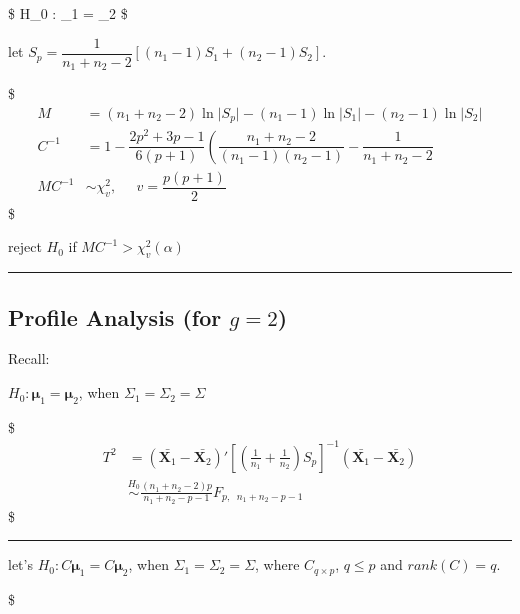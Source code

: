 \documentclass[
]{book}
\begin{document}
{{{\$
H\_0 : \Sigma\_1 = \Sigma\_2
\$

let \(S_p = \dfrac{1}{n_1 + n_2 - 2} \left[ (n_1 - 1) S_1 + (n_2 - 1) S_2 \right]\).

\$
\begin{align*}

M &= (n_1 + n_2 - 2) \ln \vert S_p \vert - (n_1 - 1) \ln \vert S_1 \vert - (n_2 - 1) \ln \vert S_2 \vert \tag{test stat} \\

C^{-1} &= 1 - \dfrac{2p^2 + 3p -1}{6(p+1)} \left( \dfrac {n_1 + n_2 - 2}{(n_1-1)(n_2 - 1)} - \dfrac {1}{n_1 + n_2 - 2} \tag{Scale Factor} \\

MC^{-1} &\sim \chi_v^2, \; \; \; \; \; v=\dfrac{p(p+1)}{2}
\end{align*}
\$

reject \(H_0\) if \(MC^{-1} > \chi_v^2(\alpha)\)

\begin{center}\rule{0.5\linewidth}{0.5pt}\end{center}

\hypertarget{profile-analysis-for-g2}{%
\subsection{\texorpdfstring{Profile Analysis (for \(g=2\))}{Profile Analysis (for g=2)}}\label{profile-analysis-for-g2}}

Recall:

\(H_0: \pmb \mu_1 = \pmb \mu_2\), when \(\Sigma_1 = \Sigma_2 = \Sigma\)

\$
\begin{align*}

T^2 &= (\bar {\pmb X_1} - \bar {\pmb X_2})' \left[ \left( \tfrac{1}{n_1} + \tfrac{1}{n_2} \right) S_p \right]^{-1} (\bar {\pmb X_1} - \bar {\pmb X_2}) \\

&\overset {H_0} {\sim} \tfrac {(n_1 + n_2 -2)p} {n_1 + n_2-p-1} F_{p, \; \; n_1 + n_2 -p -1}

\end{align*}
\$

\begin{center}\rule{0.5\linewidth}{0.5pt}\end{center}

let's \(H_0: C \pmb \mu_1 = C \pmb \mu_2\), when \(\Sigma_1 = \Sigma_2 = \Sigma\), where \(C_{q \times p}\), \(q \le p\) and \(rank(C)=q\).

\$
\begin{align*}


\end{align*}}}}
\end{document}
